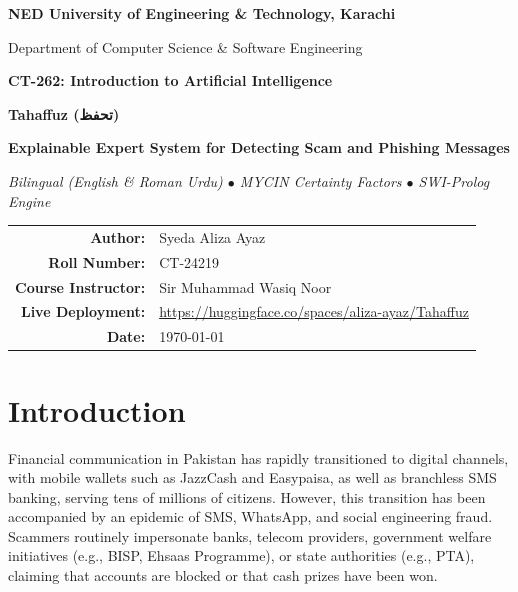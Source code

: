 \documentclass[11pt,a4paper]{article}
\begin{document}
\begin{titlepage}
    \centering
    \vspace*{1.5cm}
    {\LARGE \textbf{NED University of Engineering \& Technology, Karachi}\par}
    \vspace{0.4cm}
    {\large Department of Computer Science \& Software Engineering\par}
    \vspace{0.2cm}
    {\normalsize \textbf{CT-262: Introduction to Artificial Intelligence}\par}
    \vspace{2.5cm}

    {\fontsize{32}{38}\selectfont \textbf{\textcolor{primary}{Tahaffuz (تحفظ)}}\par}
    \vspace{0.4cm}
    {\Large \textbf{Explainable Expert System for Detecting Scam and Phishing Messages}\par}
    \vspace{0.3cm}
    {\normalsize \textit{Bilingual (English \& Roman Urdu) $\bullet$ MYCIN Certainty Factors $\bullet$ SWI-Prolog Engine}\par}
    \vspace{2.5cm}

    \begin{tabular}{rl}
        \textbf{Author:} & Syeda Aliza Ayaz \\
        \textbf{Roll Number:} & CT-24219 \\
        \textbf{Course Instructor:} & Sir Muhammad Wasiq Noor \\
        \textbf{Live Deployment:} & \url{https://huggingface.co/spaces/aliza-ayaz/Tahaffuz} \\
        \textbf{Date:} & \today
    \end{tabular}
    \vfill
\end{titlepage}

\newpage

\section{Introduction}

Financial communication in Pakistan has rapidly transitioned to digital channels, with mobile wallets such as JazzCash and Easypaisa, as well as branchless SMS banking, serving tens of millions of citizens. However, this transition has been accompanied by an epidemic of SMS, WhatsApp, and social engineering fraud. Scammers routinely impersonate banks, telecom providers, government welfare initiatives (e.g., BISP, Ehsaas Programme), or state authorities (e.g., PTA), claiming that accounts are blocked or that cash prizes have been won.
\end{document}
